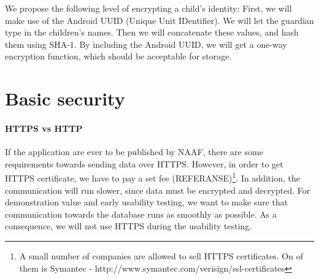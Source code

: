 We propose the following level of encrypting a child's identity:
First, we will make use of the Android UUID (Unique Unit IDentifier). We will let the guardian type in the children's names. Then we will concatenate these values, and hash them using SHA-1. By including the Android UUID, we will get a one-way encryption function, which should be acceptable for storage.
 




\section{Basic security}
\paragraph{HTTPS vs HTTP} If the application are ever to be published by NAAF, there are some requirements towards sending data over HTTPS. However, in order to get HTTPS certificate, we have to pay a set fee (REFERANSE)\footnote{A small number of companies are allowed to sell HTTPS certificates. On of them is Symantec - http://www.symantec.com/verisign/ssl-certificates}. In addition, the communication will run slower, since data must be encrypted and decrypted. For demonstration value and early usability testing, we want to make sure that communication towards the database runs as smoothly as possible. As a consequence, we will not use HTTPS during the usability testing.


    
